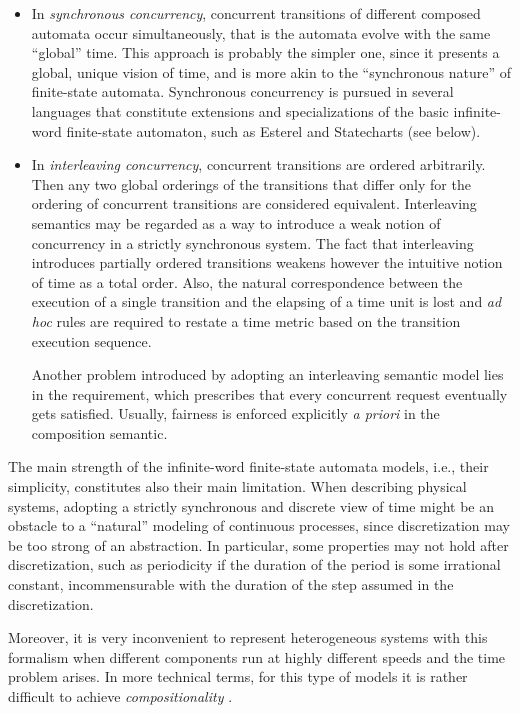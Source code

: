 \begin{itemize}
\item In \emph{synchronous concurrency}, concurrent transitions of different 
composed automata occur simultaneously, that is the automata 
evolve with the same ``global'' time. This approach is probably 
the simpler one, since it presents a global, unique vision of 
time, and is more akin to the ``synchronous nature'' of finite-state 
automata. Synchronous concurrency is pursued in several languages 
that constitute extensions and specializations of the basic infinite-word 
finite-state automaton, such as Esterel \cite{BG92} and Statecharts (see below).

\item In \emph{interleaving concurrency}, concurrent transitions 
are ordered arbitrarily. Then any two global orderings of the 
transitions that differ only for the ordering of concurrent transitions 
are considered equivalent. Interleaving semantics may be regarded 
as a way to introduce a weak notion of concurrency in a strictly 
synchronous system. The fact that interleaving introduces partially 
ordered transitions weakens however the intuitive notion of time 
as a total order. Also, the natural correspondence between the 
execution of a single transition and the elapsing of a time unit 
is lost and \emph{ad hoc} rules are required to restate a time metric 
based on the transition execution sequence.

Another problem introduced by adopting an interleaving semantic 
model lies in the  requirement, which prescribes that 
every concurrent request eventually gets satisfied. Usually, 
fairness is enforced explicitly \emph{a priori} in the 
composition semantic. 
\end{itemize}

The main strength of the infinite-word finite-state automata 
models, i.e., their simplicity, constitutes also their main limitation. 
When describing physical systems, adopting a strictly synchronous 
and discrete view of time might be an obstacle to a ``natural'' 
modeling of continuous processes, since discretization may be 
too strong of an abstraction. In particular, some properties 
may not hold after discretization, such as periodicity if the 
duration of the period is some irrational constant, incommensurable 
with the duration of the step assumed in the discretization. 

Moreover, it is very inconvenient to represent heterogeneous systems
with this formalism when different components run at highly different
speeds and the time  problem arises. In more technical
terms, for this type of models it is rather difficult to achieve
\emph{compositionality} \cite{AFH96,AH92}.


